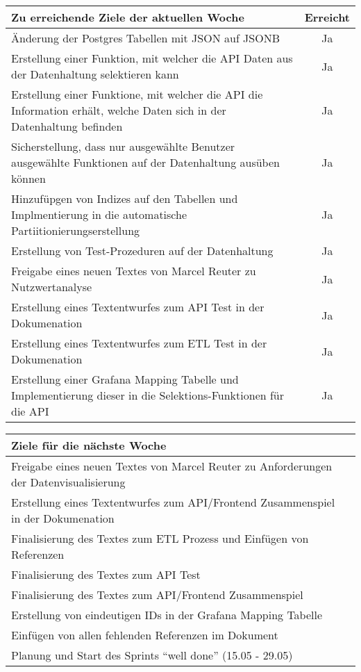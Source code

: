 \begin{tabularx}{\textwidth}{Xc}
    \arrayrulecolor{OliveGreen}
    \toprule
    {\bfseries Zu erreichende Ziele der aktuellen Woche} & {\bfseries Erreicht} \\
    \midrule[2pt]
    Änderung der Postgres Tabellen mit JSON auf JSONB &Ja \\
    \rowcolor{OliveGreen!15}
    Erstellung einer Funktion, mit welcher die API Daten aus der Datenhaltung
    selektieren kann &Ja \\
    \rowcolor{White}
    Erstellung einer Funktione, mit welcher die API die Information erhält,
    welche Daten sich in der Datenhaltung befinden &Ja \\
    \rowcolor{OliveGreen!15}
    Sicherstellung, dass nur ausgewählte Benutzer ausgewählte Funktionen
    auf der Datenhaltung ausüben können &Ja \\
    \rowcolor{White}
    Hinzufüpgen von Indizes auf den Tabellen und Implmentierung in die
    automatische Partiitionierungserstellung &Ja \\
    \rowcolor{OliveGreen!15}
    Erstellung von Test-Prozeduren auf der Datenhaltung &Ja \\
    \rowcolor{White}
    Freigabe eines neuen Textes von Marcel Reuter zu Nutzwertanalyse &Ja \\
    \rowcolor{OliveGreen!15}
    Erstellung eines Textentwurfes zum API Test in der Dokumenation &Ja \\
    \rowcolor{White}
    Erstellung eines Textentwurfes zum ETL Test in der Dokumenation &Ja \\
    \rowcolor{OliveGreen!15}
    Erstellung einer Grafana Mapping Tabelle und Implementierung dieser in die
    Selektions-Funktionen für die API &Ja \\
    \bottomrule[2pt]
\end{tabularx}
%
\vspace{1cm}
%
\begin{tabularx}{\textwidth}{Xc}
    \arrayrulecolor{OliveGreen}
    \toprule
    {\bfseries Ziele für die nächste Woche}              &                   \\
    \midrule[2pt]
    Freigabe eines neuen Textes von Marcel Reuter zu Anforderungen der 
    Datenvisualisierung & \\
    \rowcolor{OliveGreen!15}
    Erstellung eines Textentwurfes zum API/Frontend Zusammenspiel in der
    Dokumenation & \\
    \rowcolor{White}
    Finalisierung des Textes zum ETL Prozess und Einfügen von Referenzen & \\
    \rowcolor{OliveGreen!15}
    Finalisierung des Textes zum API Test & \\
    \rowcolor{White}
    Finalisierung des Textes zum API/Frontend Zusammenspiel & \\
    \rowcolor{OliveGreen!15}
    Erstellung von eindeutigen IDs in der Grafana Mapping Tabelle & \\
    \rowcolor{White}
    Einfügen von allen fehlenden Referenzen im Dokument & \\
    \rowcolor{OliveGreen!15}
    Planung und Start des Sprints ``well done'' (15.05 - 29.05) & \\
\end{tabularx}
